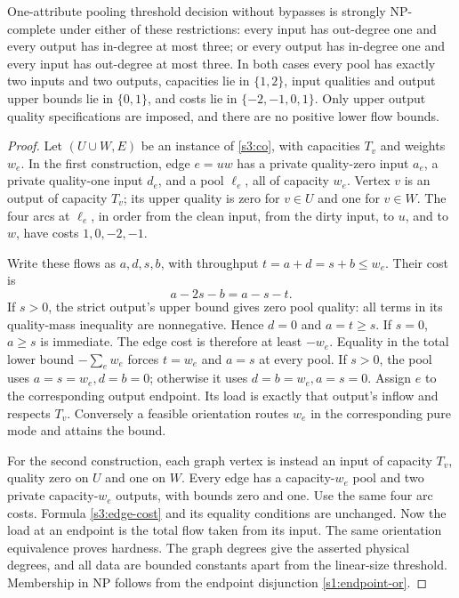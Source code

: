 \begin{theorem}\label{s3:local-degrees}
One-attribute pooling threshold decision without bypasses is strongly
NP-complete under either of these restrictions: every input has out-degree
one and every output has in-degree at most three; or every output has
in-degree one and every
input has out-degree at most three. In both cases every pool has exactly
two inputs and two outputs, capacities lie in $\{1,2\}$, input qualities
and output upper bounds lie in $\{0,1\}$, and costs lie in
$\{-2,-1,0,1\}$. Only upper output quality specifications are imposed,
and there are no positive lower flow bounds.
\end{theorem}
\begin{proof}
Let $(U\cup W,E)$ be an instance of \cref{s3:co}, with capacities $T_v$
and weights $w_e$. In the first construction, edge $e=uw$ has a private
quality-zero input $a_e$, a private quality-one input $d_e$, and a pool
$\ell_e$, all of capacity $w_e$. Vertex $v$ is an output of capacity
$T_v$; its upper quality is zero for $v\in U$ and one for $v\in W$.
The four arcs at $\ell_e$, in order from the clean input, from the dirty
input, to $u$, and to $w$, have costs $1,0,-2,-1$.

Write these flows as $a,d,s,b$, with throughput
$t=a+d=s+b\le w_e$. Their cost is
\begin{equation}
 a-2s-b=a-s-t.\label{s3:edge-cost}
\end{equation}
If $s>0$, the strict output's upper bound gives zero pool quality:
all terms in its quality-mass inequality are nonnegative. Hence $d=0$
and $a=t\ge s$. If $s=0$, $a\ge s$ is immediate. The edge cost is
therefore at least $-w_e$. Equality in the total lower bound
$-\sum_e w_e$ forces $t=w_e$ and $a=s$ at every pool. If $s>0$, the
pool uses $a=s=w_e,d=b=0$; otherwise it uses $d=b=w_e,a=s=0$.
Assign $e$ to the corresponding output endpoint. Its load is exactly
that output's inflow and respects $T_v$. Conversely a feasible orientation
routes $w_e$ in the corresponding pure mode and attains the bound.

For the second construction, each graph vertex is instead an input of
capacity $T_v$, quality zero on $U$ and one on $W$. Every edge has a
capacity-$w_e$ pool and two private capacity-$w_e$ outputs, with bounds
zero and one. Use the same four arc costs. Formula \eqref{s3:edge-cost}
and its equality conditions are unchanged. Now the load at an endpoint
is the total flow taken from its input. The same orientation equivalence
proves hardness. The graph degrees give the asserted physical degrees,
and all data are bounded constants apart from the linear-size threshold.
Membership in NP follows from the endpoint disjunction
\eqref{s1:endpoint-or}.
\end{proof}

